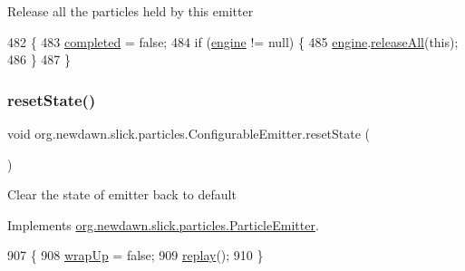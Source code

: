Release all the particles held by this emitter 
\begin{DoxyCode}
482                         \{
483         \mbox{\hyperlink{classorg_1_1newdawn_1_1slick_1_1particles_1_1_configurable_emitter_abcb8dd0c86a998fc1f386254e4a27c86}{completed}} = \textcolor{keyword}{false}; 
484         \textcolor{keywordflow}{if} (\mbox{\hyperlink{classorg_1_1newdawn_1_1slick_1_1particles_1_1_configurable_emitter_ad35b105949c7f6c67f4dba02287b3a09}{engine}} != null) \{
485             \mbox{\hyperlink{classorg_1_1newdawn_1_1slick_1_1particles_1_1_configurable_emitter_ad35b105949c7f6c67f4dba02287b3a09}{engine}}.\mbox{\hyperlink{classorg_1_1newdawn_1_1slick_1_1particles_1_1_particle_system_acd6d8aa56a1cf23dea44d8035a7966ee}{releaseAll}}(\textcolor{keyword}{this});
486         \}
487     \}
\end{DoxyCode}
\mbox{\label{classorg_1_1newdawn_1_1slick_1_1particles_1_1_configurable_emitter_a91eff5a7a412cfed942a10a261a4432e}} 
\subsubsection{\texorpdfstring{reset\+State()}{resetState()}}
{\footnotesize\ttfamily void org.\+newdawn.\+slick.\+particles.\+Configurable\+Emitter.\+reset\+State (\begin{DoxyParamCaption}{ }\end{DoxyParamCaption})\hspace{0.3cm}{\ttfamily [inline]}}

Clear the state of emitter back to default 

Implements \mbox{\hyperlink{interfaceorg_1_1newdawn_1_1slick_1_1particles_1_1_particle_emitter_a1120925a31c61fc95dc38eca9b01b9ef}{org.\+newdawn.\+slick.\+particles.\+Particle\+Emitter}}.


\begin{DoxyCode}
907                              \{
908         \mbox{\hyperlink{classorg_1_1newdawn_1_1slick_1_1particles_1_1_configurable_emitter_a641b7c71e746caa939d3a2c16976b4e4}{wrapUp}} = \textcolor{keyword}{false};
909         \mbox{\hyperlink{classorg_1_1newdawn_1_1slick_1_1particles_1_1_configurable_emitter_a86bf563a92e8c12e4390f822e872c696}{replay}}();
910     \}
\end{DoxyCode}
\mbox{\label{classorg_1_1newdawn_1_1slick_1_1particles_1_1_configurable_emitter_a7a8a0b2b5f5ecbe56ef46310a219a45b}} 
